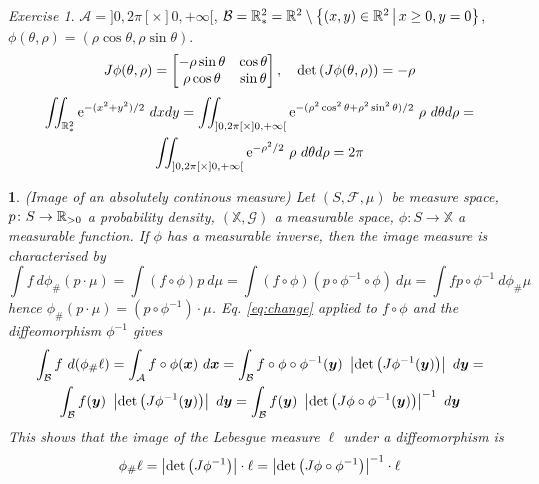 \documentclass[12pt,a4paper]{amsart}
\newcommand{\by}{\bm y}
\theoremstyle{plain}%
\newtheorem{npar}{}%
\theoremstyle{definition}
\theoremstyle{remark}
\newtheorem{exercise}{Exercise}
\begin{document}
\begin{exercise}
  $\mathcal A = ]0,2\pi[\times]0,+\infty[$, $\mathcal B = \mathbb{R}^2_* = \mathbb{R}^2 \setminus \left\{(x,y)\in\mathbb{R}^2 \, \middle| \, x\ge0,y=0 \right\}$, $\phi(\theta,\rho)=(\rho\cos \theta,\rho\sin \theta)$.
\begin{equation*}
  J\phi(\theta,\rho) = \begin{bmatrix}
- \rho \sin\theta & \cos \theta \\ \rho \cos \theta & \sin \theta  \end{bmatrix}
, \quad \operatorname{det}\left(J\phi(\theta,\rho)\right) = - \rho\end{equation*}
\begin{multline*}
\iint_{\mathbb{R}^2_*} \mathrm{e}^{-(x^2+y^2)/2} \ dxdy = \iint_{]0,2\pi[\times]0,+\infty[} \mathrm{e}^{-(\rho^2\cos^2 \theta+ \rho^2 \sin^2 \theta)/2} \ \rho \ d\theta d\rho = \\ \iint_{]0,2\pi[\times]0,+\infty[} \mathrm{e}^{-\rho^2/2} \ \rho \ d\theta d\rho = 2\pi   
\end{multline*}
\end{exercise}
\begin{npar}(Image of an absolutely continous measure)\normalfont
  Let $(S,\mathcal F,\mu)$ be measure space, $p \colon S \to \mathbb{R}_{>0}$ a probability density, $(\mathbb X,\mathcal G)$ a measurable space, $\phi \colon S \to \mathbb X$ a measurable function. If $\phi$ has a measurable inverse, then the image measure is characterised by
  \begin{equation*}
    \int f \ d\phi_{\#}(p \cdot \mu) = \int (f\circ \phi) p \ d\mu = \int (f\circ\phi) (p\circ\phi^{-1}\circ\phi) \ d\mu = \int f p\circ\phi^{-1} \  d\phi_{\#} \mu 
  \end{equation*}
hence $\phi_{\#}(p \cdot \mu) = (p\circ\phi^{-1})\cdot\mu$. Eq. \eqref{eq:change}
applied to $f \circ \phi$ and the diffeomorphism $\phi^{-1}$ gives 
\begin{multline*}
  \int_{\mathcal B} f \ d(\phi_{\#}\ell) = \int_{\mathcal A} f\circ\phi(\bx) \ d\bx = \int_{\mathcal B} f\circ\phi\circ\phi^{-1}(\by) \ \absoluteval{\detof{J\phi^{-1}(\by)}} \ d\by = \\ \int_{\mathcal B} f(\by) \ \absoluteval{\detof{J\phi^{-1}(\by)}} \ d\by = \int_{\mathcal B} f(\by) \ \absoluteval{\detof{J\phi\circ\phi^{-1}(\by)}}^{-1} \ d\by
\end{multline*}
This shows that the image of the Lebesgue measure $\ell$ under a diffeomorphism is
\begin{equation*}%
  \phi_{\#}\ell = \absoluteval{\detof{J\phi^{-1}}}\cdot\ell = \absoluteval{\detof{J\phi\circ\phi^{-1}}}^{-1} \cdot \ell  
\end{equation*}
\end{npar}
\end{document}
